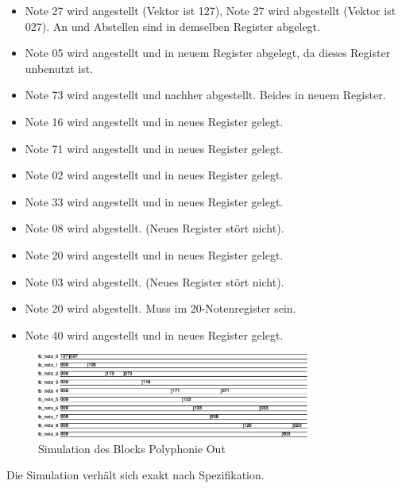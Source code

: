 \begin{itemize}
	\item Note 27 wird angestellt (Vektor ist 127), Note 27 wird abgestellt (Vektor ist 027). An und Abstellen sind in demselben Register abgelegt.
	\item Note 05 wird angestellt und in neuem Register abgelegt, da dieses Register unbenutzt ist.
	\item Note 73 wird angestellt und nachher abgestellt. Beides in neuem Register.
	\item Note 16 wird angestellt und in neues Register gelegt.
	\item Note 71 wird angestellt und in neues Register gelegt.
	\item Note 02 wird angestellt und in neues Register gelegt.
	\item Note 33 wird angestellt und in neues Register gelegt.
	\item Note 08 wird abgestellt. (Neues Register stört nicht).
	\item Note 20 wird angestellt und in neues Register gelegt.
	\item Note 03 wird abgestellt. (Neues Register stört nicht).
	\item Note 20 wird abgestellt. Muss im 20-Notenregister sein.
	\item Note 40 wird angestellt und in neues Register gelegt.
\end{itemize}

\begin{figure}[H]
	\includegraphics[width=0.8\textwidth]{images/midi_interface/tb_polyphonie.png}
	\caption{Simulation des Blocks Polyphonie Out }
	\label{fig.polyphnie_simulation}
\end{figure}

Die Simulation verhält sich exakt nach Spezifikation.

